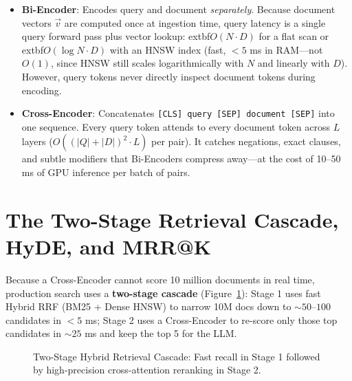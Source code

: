 \begin{itemize}[leftmargin=18pt]
  \item \textbf{Bi-Encoder}: Encodes query and document \emph{separately}. Because document vectors $\vec{v}$ are computed once at ingestion time, query latency is a single query forward pass plus vector lookup: 	extbf{$O(N \cdot D)$} for a flat scan or 	extbf{$O(\log N \cdot D)$} with an HNSW index (fast, $<5$ ms in RAM—not $O(1)$, since HNSW still scales logarithmically with $N$ and linearly with $D$). However, query tokens never directly inspect document tokens during encoding.
  \item \textbf{Cross-Encoder}: Concatenates \texttt{[CLS] query [SEP] document [SEP]} into one sequence. Every query token attends to every document token across $L$ layers ($O((|Q|+|D|)^2 \cdot L)$ per pair). It catches negations, exact clauses, and subtle modifiers that Bi-Encoders compress away—at the cost of 10--50 ms of GPU inference per batch of pairs.
\end{itemize}

\section{The Two-Stage Retrieval Cascade, HyDE, and MRR@K}

Because a Cross-Encoder cannot score 10 million documents in real time, production search uses a \textbf{two-stage cascade} (Figure~\ref{fig:v2-ch03-cascade}): Stage 1 uses fast Hybrid RRF (BM25 + Dense HNSW) to narrow 10M docs down to $\sim 50\text{--}100$ candidates in $<5$ ms; Stage 2 uses a Cross-Encoder to re-score only those top candidates in $\sim 25$ ms and keep the top 5 for the LLM.

\begin{figure}[htbp]
\centering
{}
\caption{Two-Stage Hybrid Retrieval Cascade: Fast recall in Stage 1 followed by high-precision cross-attention reranking in Stage 2.}
\label{fig:v2-ch03-cascade}
\end{figure}


